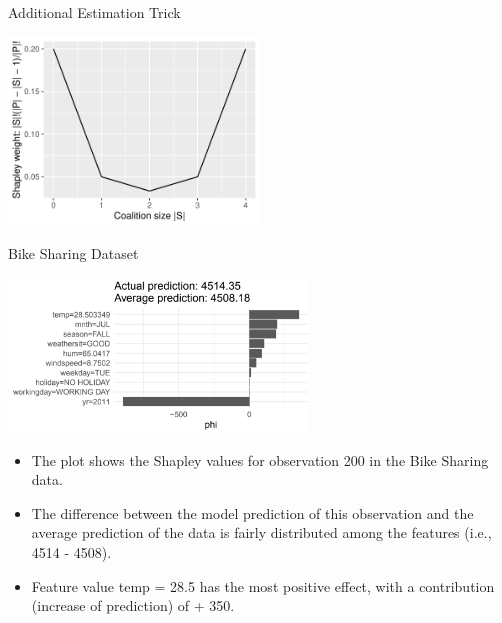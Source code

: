\documentclass[11pt,compress,t,notes=noshow, aspectratio=169, xcolor=table]{beamer}
\begin{document}
\begin{vbframe}{Additional Estimation Trick}
      \begin{center}
        \includegraphics[width=0.5\textwidth]{figure/shapley-weights}
      \end{center}
\end{vbframe}

\begin{vbframe}{Bike Sharing Dataset}

\begin{center}
\includegraphics[width=0.6\textwidth]{figure_man/bike-sharing03.png}
\end{center}

\begin{itemize}
    \item The plot shows the Shapley values for observation 200 in the Bike Sharing data.
    \item The difference between the model prediction of this observation and the average prediction of the data is fairly distributed among the features (i.e., 4514 - 4508).
    \item Feature value temp = 28.5 has the most positive effect, with a contribution (increase of prediction) of + 350.
\end{itemize}
\end{vbframe}

\end{document}
